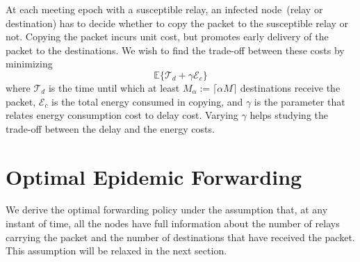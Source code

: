 \documentclass[10pt,journal,letterpaper]{IEEEtran}
\newtheorem{remarks}{Remarks}[section]
\newcommand{\remove}[1]{}
\begin{document}
\remove{
 The goal is to deliver the packet to a fraction
$\alpha$~($\alpha < 1$) of the $M$ destinations within a short
duration. Thanks to the intermittent connectivity, nodes only have
beliefs about the number of infected destinations. Let
$\mathcal{T}_d$ be a time such that with high probability the
fraction of infected nodes at $\mathcal{T}_d$ is close to $\alpha$.
More precisely, if $m(t)$ is the number of infected destinations at
time $t$, then for any $\epsilon > 0$,
\begin{equation*}
\lim_{K \rightarrow \infty} \mathbb{P}\left(\left|\frac{m(\mathcal{T}_d)}{M} - \alpha\right| > \epsilon \right) = 0.\footnote{Both, the number of destinations and the number of relays,
are scaled together such that their ratio, $\frac{M}{N}$, remains fixed.}
\end{equation*}
We want to shorten $\mathcal{T}_d$. }

At each meeting epoch with a susceptible relay, an infected
node~(relay or destination) has to decide whether to copy the
packet to the susceptible relay or not. Copying the packet incurs
unit cost, but promotes early delivery of the packet to the
destinations.
We wish to find the trade-off between these costs by minimizing
\begin{equation}
\label{eqn-objective}
\mathbb{E}\{\mathcal{T}_d + \gamma \mathcal{E}_c\}
\end{equation}
where $\mathcal{T}_d$ is the time until which at least $M_{\alpha}
:= \lceil \alpha M \rceil$ destinations receive the packet,
$\mathcal{E}_c$ is the total energy consumed
in copying, and $\gamma$ is the parameter that relates
energy consumption cost to delay cost. Varying $\gamma$ helps studying
the trade-off between the delay and the energy costs.

\remove{
\begin{remarks}
In the presence of complete information, every node knows when
the desired fraction of destinations receive the packet.
Thus no copying is done to the remaining susceptible destinations. In the case
of partial information copying to the susceptible destinations is stopped
at $\mathcal{T}_d$. This ensures that the fraction of infected destinations is
close to $\alpha$.
\end{remarks}
}
\section{Optimal Epidemic Forwarding}
\label{forwarding-policy}
We derive the optimal forwarding policy under the assumption that, at any instant of time,
all the nodes have full information about the number of relays carrying the
packet and the number of destinations that have received the packet.
This assumption will be relaxed in the next section.
\end{document}
